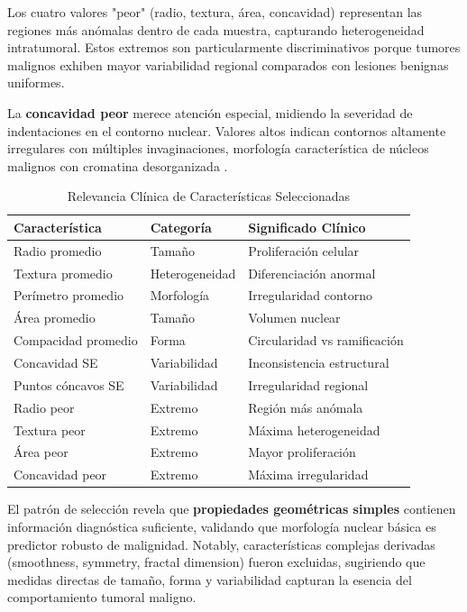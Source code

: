 \documentclass[conference]{IEEEtran}
\begin{document}
Los cuatro valores "peor" (radio, textura, área, concavidad) representan las regiones más anómalas dentro de cada muestra, capturando heterogeneidad intratumoral. Estos extremos son particularmente discriminativos porque tumores malignos exhiben mayor variabilidad regional comparados con lesiones benignas uniformes.

La \textbf{concavidad peor} merece atención especial, midiendo la severidad de indentaciones en el contorno nuclear. Valores altos indican contornos altamente irregulares con múltiples invaginaciones, morfología característica de núcleos malignos con cromatina desorganizada \cite{street1993}.

\begin{table}[htbp]
\caption{Relevancia Clínica de Características Seleccionadas}
\begin{center}
\footnotesize
\begin{tabular}{|l|l|p{3cm}|}
\hline
\textbf{Característica} & \textbf{Categoría} & \textbf{Significado Clínico} \\
\hline
Radio promedio & Tamaño & Proliferación celular \\
\hline
Textura promedio & Heterogeneidad & Diferenciación anormal \\
\hline
Perímetro promedio & Morfología & Irregularidad contorno \\
\hline
Área promedio & Tamaño & Volumen nuclear \\
\hline
Compacidad promedio & Forma & Circularidad vs ramificación \\
\hline
Concavidad SE & Variabilidad & Inconsistencia estructural \\
\hline
Puntos cóncavos SE & Variabilidad & Irregularidad regional \\
\hline
Radio peor & Extremo & Región más anómala \\
\hline
Textura peor & Extremo & Máxima heterogeneidad \\
\hline
Área peor & Extremo & Mayor proliferación \\
\hline
Concavidad peor & Extremo & Máxima irregularidad \\
\hline
\end{tabular}
\label{tab8}
\end{center}
\end{table}

El patrón de selección revela que \textbf{propiedades geométricas simples} contienen información diagnóstica suficiente, validando que morfología nuclear básica es predictor robusto de malignidad. Notably, características complejas derivadas (smoothness, symmetry, fractal dimension) fueron excluidas, sugiriendo que medidas directas de tamaño, forma y variabilidad capturan la esencia del comportamiento tumoral maligno.
\end{document}
